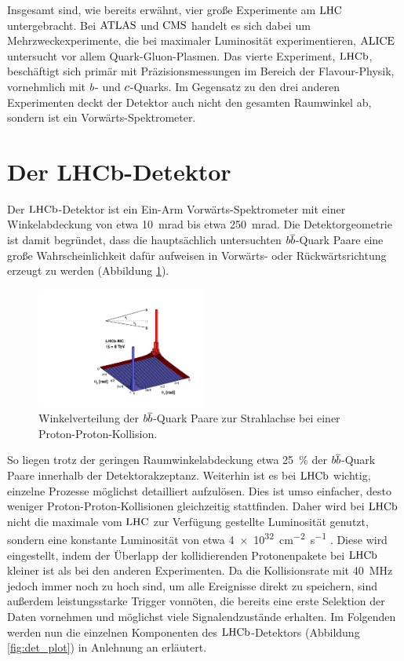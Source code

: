 Insgesamt sind, wie bereits erwähnt, vier große Experimente am $\mbox{LHC}$ untergebracht. Bei $\mbox{ATLAS}$ und $\mbox{CMS}$ handelt es sich dabei um Mehrzweckexperimente, die bei maximaler Luminosität experimentieren, $\mbox{ALICE}$ untersucht vor allem Quark-Gluon-Plasmen. Das vierte Experiment, $\mbox{LHCb}$, beschäftigt sich primär mit Präzisionsmessungen im Bereich der Flavour-Physik, vornehmlich mit ${b}$- und ${c}$-Quarks. Im Gegensatz zu den drei anderen Experimenten deckt der Detektor auch nicht den gesamten Raumwinkel ab, sondern ist ein Vorwärts-Spektrometer.

\section{Der LHCb-Detektor}

Der $\mbox{LHCb}$-Detektor ist ein Ein-Arm Vorwärts-Spektrometer mit einer Winkelabdeckung von etwa \SI{10}{mrad} bis etwa \SI{250}{mrad}. Die Detektorgeometrie ist damit begründet, dass die hauptsächlich untersuchten ${{b}{\overline {{b}}}}$-Quark Paare eine große Wahrscheinlichkeit dafür aufweisen in Vorwärts- oder Rückwärtsrichtung erzeugt zu werden (Abbildung \ref{fig:angle_plot}).  
\begin{figure}[htpb]
	\centering
		\includegraphics[width=0.5\textwidth]{fig/angle_plot.pdf}
	\caption{Winkelverteilung der ${{b}{\overline {{b}}}}$-Quark Paare zur Strahlachse bei einer Proton-Proton-Kollision. \cite{angle_plot}}
	\label{fig:angle_plot} 
\end{figure} 
So liegen trotz der geringen Raumwinkelabdeckung etwa \SI{25}{\%} der ${{b}{\overline {{b}}}}$-Quark Paare innerhalb der Detektorakzeptanz. Weiterhin ist es bei $\mbox{LHCb}$ wichtig, einzelne Prozesse möglichst detailliert aufzulösen. Dies ist umso einfacher, desto weniger Proton-Proton-Kollisionen gleichzeitig stattfinden. Daher wird bei $\mbox{LHCb}$ nicht die maximale vom $\mbox{LHC}$ zur Verfügung gestellte Luminosität genutzt, sondern eine konstante Luminosität von etwa \SI[exponent-product = \cdot]{4e32}{cm^{-2}s^{-1}} \cite{LHC_statistik}. Diese wird eingestellt, indem der Überlapp der kollidierenden Protonenpakete bei $\mbox{LHCb}$ kleiner ist als bei den anderen Experimenten. Da die Kollisionsrate mit \SI{40}{MHz} jedoch immer noch zu hoch sind, um alle Ereignisse direkt zu speichern, sind außerdem leistungsstarke Trigger vonnöten, die bereits eine erste Selektion der Daten vornehmen und möglichst viele Signalendzustände erhalten. Im Folgenden werden nun die einzelnen Komponenten des $\mbox{LHCb}$-Detektors (Abbildung \ref{fig:det_plot}) in Anlehnung an \cite{Alves:2008zz}  erläutert.
